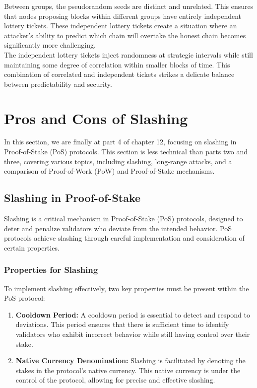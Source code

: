 Between groups, the pseudorandom seeds are distinct and unrelated. This ensures that nodes proposing blocks within different groups have entirely independent lottery tickets. These independent lottery tickets create a situation where an attacker's ability to predict which chain will overtake the honest chain becomes significantly more challenging.\\
The independent lottery tickets inject randomness at strategic intervals while still maintaining some degree of correlation within smaller blocks of time. This combination of correlated and independent tickets strikes a delicate balance between predictability and security.

\section{Pros and Cons of Slashing}
In this section, we are finally at part 4 of chapter 12, focusing on slashing in Proof-of-Stake (PoS) protocols. This section is less technical than parts two and three, covering various topics, including slashing, long-range attacks, and a comparison of Proof-of-Work (PoW) and Proof-of-Stake mechanisms.
\subsection{Slashing in Proof-of-Stake}
Slashing is a critical mechanism in Proof-of-Stake (PoS) protocols, designed to deter and penalize validators who deviate from the intended behavior. PoS protocols achieve slashing through careful implementation and consideration of certain properties.

\subsubsection{Properties for Slashing}
To implement slashing effectively, two key properties must be present within the PoS protocol:

\begin{enumerate}[label=\alph*)]
  \item \textbf{Cooldown Period:} A cooldown period is essential to detect and respond to deviations. This period ensures that there is sufficient time to identify validators who exhibit incorrect behavior while still having control over their stake.
  
  \item \textbf{Native Currency Denomination:} Slashing is facilitated by denoting the stakes in the protocol's native currency. This native currency is under the control of the protocol, allowing for precise and effective slashing.
\end{enumerate}

